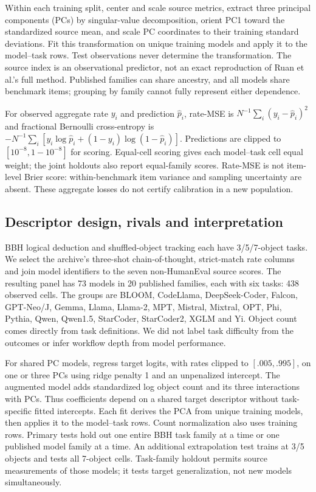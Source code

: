 Within each training split, center and scale source metrics, extract three principal components (PCs) by singular-value decomposition, orient PC1 toward the standardized source mean, and scale PC coordinates to their training standard deviations. Fit this transformation on unique training models and apply it to the model--task rows. Test observations never determine the transformation. The source index is an observational predictor, not an exact reproduction of Ruan et al.'s full method. Published families can share ancestry, and all models share benchmark items; grouping by family cannot fully represent either dependence.

For observed aggregate rate $y_i$ and prediction $\widehat p_i$, rate-MSE is $N^{-1}\sum_i(y_i-\widehat p_i)^2$ and fractional Bernoulli cross-entropy is $-N^{-1}\sum_i[y_i\log\widehat p_i+(1-y_i)\log(1-\widehat p_i)]$. Predictions are clipped to $[10^{-8},1-10^{-8}]$ for scoring. Equal-cell scoring gives each model--task cell equal weight; the joint holdouts also report equal-family scores. Rate-MSE is not item-level Brier score: within-benchmark item variance and sampling uncertainty are absent. These aggregate losses do not certify calibration in a new population.

\subsection{Descriptor design, rivals and interpretation}
BBH logical deduction and shuffled-object tracking each have 3/5/7-object tasks. We select the archive's three-shot chain-of-thought, strict-match rate columns and join model identifiers to the seven non-HumanEval source scores. The resulting panel has 73 models in 20 published families, each with six tasks: 438 observed cells. The groups are BLOOM, CodeLlama, DeepSeek-Coder, Falcon, GPT-Neo/J, Gemma, Llama, Llama-2, MPT, Mistral, Mixtral, OPT, Phi, Pythia, Qwen, Qwen1.5, StarCoder, StarCoder2, XGLM and Yi. Object count comes directly from task definitions. We did not label task difficulty from the outcomes or infer workflow depth from model performance.

For shared PC models, regress target logits, with rates clipped to $[.005,.995]$, on one or three PCs using ridge penalty 1 and an unpenalized intercept. The augmented model adds standardized log object count and its three interactions with PCs. Thus coefficients depend on a shared target descriptor without task-specific fitted intercepts. Each fit derives the PCA from unique training models, then applies it to the model--task rows. Count normalization also uses training rows. Primary tests hold out one entire BBH task family at a time or one published model family at a time. An additional extrapolation test trains at 3/5 objects and tests all 7-object cells. Task-family holdout permits source measurements of those models; it tests target generalization, not new models simultaneously.

